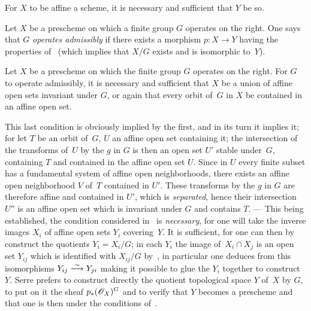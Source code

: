 \begin{corollary}
\label{V.1.6}
For $X$ to be affine \resp a scheme, it is necessary and sufficient that $Y$ be
so.
\end{corollary}

\begin{definition}
\label{V.1.7}
Let
$X$ be a prescheme on which a finite group $G$ operates
on the right. One says that $G$ \emph{operates admissibly}
if there exists a morphism $p\colon X\to Y$ having the properties
of~ (which implies that $X/G$ exists and is isomorphic
to~$Y$).
\end{definition}

\begin{proposition}
\label{V.1.8}
Let $X$ be a prescheme on which the finite group $G$ operates
on the right. For $G$ to operate admissibly, it is necessary
and sufficient that $X$ be a union of affine open sets invariant under
$G$, or again that every orbit of~$G$ in $X$ be contained
in an affine open set.
\end{proposition}

This last condition is obviously implied by the
first, and in its turn it implies it; for let $T$ be an
orbit of~$G$, $U$ an affine open set containing it; the intersection
of the transforms of~$U$ by the
$g$ in $G$
is then an open set $U'$ stable under~$G$, containing $T$ and contained in
the affine open set $U$. Since in $U$ every finite subset has a
fundamental system of affine open neighborhoods, there exists an
affine open neighborhood $V$ of~$T$ contained in $U'$. These
transforms by the
$g$ in $G$
are therefore affine and contained in $U'$, which is \emph{separated},
hence their intersection $U''$ is an affine open set which is invariant
under $G$ and contains $T$.
--- This being established, the condition considered in~ is
\emph{necessary}, for one will take the inverse images $X_i$
of affine open sets $Y_i$ covering~$Y$. It is sufficient, for one
can then by~ construct the quotients $Y_i=X_i/G$; in
each $Y_i$ the image of~$X_i\cap X_j$ is an open set $Y_{ij}$
which is identified with $X_{ij}/G$ by~, in particular one
deduces from this isomorphisms $Y_{ij}\overset{\sim}{\longrightarrow} Y_{ji}$ making it possible to
glue the $Y_i$ together to construct $Y$. Serre prefers to
construct directly the quotient topological space $Y$ of~$X$ by
$G$, to put on it the sheaf $p_*(\cal{O}_X)^G$ and to verify that
$Y$ becomes a prescheme and that one is then under the
conditions of~.

